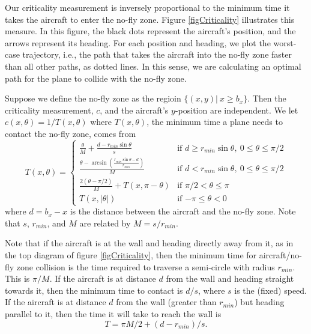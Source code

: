 \documentclass[11pt]{article}
\begin{document}
Our criticality measurement is inversely proportional to the minimum
time it takes the aircraft to enter the no-fly zone.  Figure
\ref{figCriticality} illustrates this measure.  In this figure, the
black dots represent the aircraft's position, and the arrows represent
its heading. For each position and heading, we plot the worst-case
trajectory, i.e., the path that takes the aircraft into the
no-fly zone faster than all other paths, as dotted lines.  In this
sense, we are calculating an optimal path for the plane to collide with
the no-fly zone.

Suppose we define the no-fly zone as the regioin $\{(x,y)|\ x \geq b_{x}\}$. Then the
criticality measurement, $c$, and the aircraft's $y$-position are
independent. We let  $c(x, \theta) = 1 / T(x, \theta)$ where
$T(x, \theta)$, the minimum time a plane needs to contact the no-fly
zone, comes from
\begin{equation}
T(x, \theta) = \left\{ \begin{array}{ll}
\frac{\theta}{M} + \frac{d - r_{min}\sin{\theta}}{s} & \mbox{if $d \geq r_{min}\sin{\theta},\ 0 \leq \theta \leq \pi/2$} \\
\frac{\theta - \arcsin{\left( \frac{r_{min}\sin{\theta}- d}{r_{min}}\right) }}{M} & \mbox{if $d < r_{min}\sin{\theta},\ 0 \leq \theta \leq \pi/2$} \\
\frac{2(\theta - \pi/2)}{M} + T(x, \pi - \theta) & \mbox{if $\pi/2 < \theta \leq \pi$} \\
T(x, |\theta|) & \mbox{if $-\pi \leq \theta < 0$}
\end{array}
\right. \label{eq:bigT}
\end{equation}
where $d = b_{x} - x$ is the distance between the aircraft and the no-fly zone.
Note that $s$, $r_{min}$, and $M$ are related by $M = s/r_{min}$.

Note that if the aircraft is at the wall and heading directly away
from it, as in the top diagram of figure \ref{figCriticality}, then
the minimum time for aircraft/no-fly zone collision is the time
required to traverse a semi-circle with radius $r_{min}$.  This is
$\pi/M$.  If the aircraft is at distance $d$ from the wall and heading
straight towards it, then the minimum time to contact is $d/s$, where
$s$ is the (fixed) speed.  If the aircraft is at distance $d$ from the
wall (greater than $r_{min}$) but heading parallel to it, then the
time it will take to reach the wall is
\[
T = \pi M/2+(d-r_{min})/s .
\]

\end{document}
